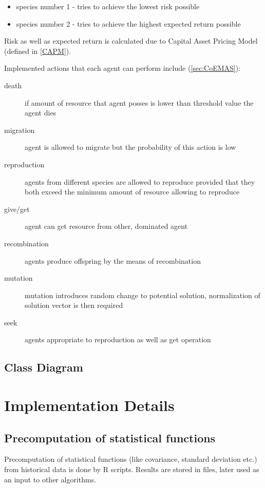 \begin{itemize}
  \item species number 1 - tries to achieve the lowest risk possible
  \item species number 2 - tries to achieve the highest expected return possible
\end{itemize}

Risk as well as expected return is calculated due to Capital Asset Pricing Model (defined in \ref{CAPM}).

Implemented actions that each agent can perform include (\ref{sec:CoEMAS}):

\begin{description}
  \item [death]
      if amount of resource that agent posses is lower than threshold value the agent dies
  \item [migration]
      agent is allowed to migrate but the probability of this action is low
  \item [reproduction]
      agents from different species are allowed to reproduce provided that they both exceed the minimum amount of resource allowing to reproduce
  \item [give/get]
      agent can get resource from other, dominated agent
  \item [recombination]
      agents produce offspring by the means of recombination
  \item [mutation]
      mutation introduces random change to potential solution, normalization of solution vector is then required 
  \item [seek]
      agents appropriate  to reproduction as well as get operation
\end{description}



\subsection{Class Diagram}



\section{Implementation Details}
\label{sec:implDetails}

\subsection{Precomputation of statistical functions}
\label{precompute}
Precomputation of statistical functions (like covariance, standard deviation etc.) from historical data is done by R scripts. 
Results are stored in files, later used as an input to other algorithms.

